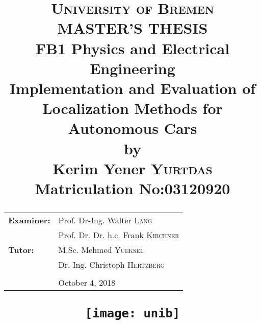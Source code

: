 \title{
\textsc{University of Bremen}\\
\vspace{15pt}
\textbf{\large MASTER'S THESIS}\\
\vspace{5pt}
\large FB1 Physics and Electrical Engineering \\
\vspace{5pt}
{\LARGE \textbf{Implementation and Evaluation of Localization Methods for Autonomous Cars}\\
\large by\\ Kerim Yener \textsc{Yurtdas}\\
{Matriculation No:03120920}}
\vspace{3.66cm}
\\
\begin{tabular}{l l}
    \textbf{Examiner:} &Prof. Dr-Ing. Walter \textsc{Lang} \\
                       &Prof. Dr. Dr. h.c. Frank \textsc{Kirchner} 
\vspace{3.66cm}
\\
\textbf{Tutor:}        &M.Sc. Mehmed \textsc{Yueksel}\\
                       &Dr.-Ing. Christoph \textsc{Hertzberg}\\
\vspace{3.66cm}
\\
                       &October 4, 2018
\end{tabular}
\vfill
\centering
\texttt{[image: unib]}}
\date{}
\author{}